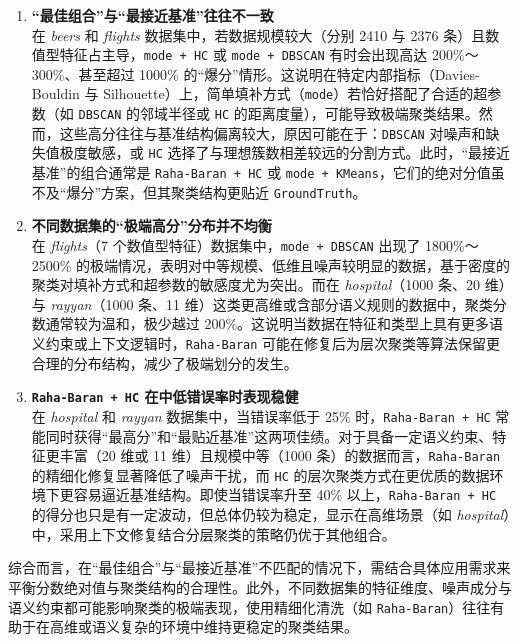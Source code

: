\documentclass[10pt]{article} %
\numberwithin{equation}{section}
\begin{document}
\begin{enumerate}
    \item \textbf{“最佳组合”与“最接近基准”往往不一致}  \\
    在 \textit{beers} 和 \textit{flights} 数据集中，若数据规模较大（分别 2410 与 2376 条）且数值型特征占主导，\texttt{mode + HC} 或 \texttt{mode + DBSCAN} 有时会出现高达 200\%～300\%、甚至超过 1000\% 的“爆分”情形。这说明在特定内部指标（Davies-Bouldin 与 Silhouette）上，简单填补方式（\texttt{mode}）若恰好搭配了合适的超参数（如 \texttt{DBSCAN} 的邻域半径或 \texttt{HC} 的距离度量），可能导致极端聚类结果。然而，这些高分往往与基准结构偏离较大，原因可能在于：\texttt{DBSCAN} 对噪声和缺失值极度敏感，或 \texttt{HC} 选择了与理想簇数相差较远的分割方式。此时，“最接近基准”的组合通常是 \texttt{Raha-Baran + HC} 或 \texttt{mode + KMeans}，它们的绝对分值虽不及“爆分”方案，但其聚类结构更贴近 \texttt{GroundTruth}。

    \item \textbf{不同数据集的“极端高分”分布并不均衡}  \\
    在 \textit{flights}（7 个数值型特征）数据集中，\texttt{mode + DBSCAN} 出现了 1800\%～2500\% 的极端情况，表明对中等规模、低维且噪声较明显的数据，基于密度的聚类对填补方式和超参数的敏感度尤为突出。而在 \textit{hospital}（1000 条、20 维）与 \textit{rayyan}（1000 条、11 维）这类更高维或含部分语义规则的数据中，聚类分数通常较为温和，极少越过 200\%。这说明当数据在特征和类型上具有更多语义约束或上下文逻辑时，\texttt{Raha-Baran} 可能在修复后为层次聚类等算法保留更合理的分布结构，减少了极端划分的发生。

    \item \textbf{\texttt{Raha-Baran + HC} 在中低错误率时表现稳健}  \\
    在 \textit{hospital} 和 \textit{rayyan} 数据集中，当错误率低于 25\% 时，\texttt{Raha-Baran + HC} 常能同时获得“最高分”和“最贴近基准”这两项佳绩。对于具备一定语义约束、特征更丰富（20 维或 11 维）且规模中等（1000 条）的数据而言，\texttt{Raha-Baran} 的精细化修复显著降低了噪声干扰，而 \texttt{HC} 的层次聚类方式在更优质的数据环境下更容易逼近基准结构。即使当错误率升至 40\% 以上，\texttt{Raha-Baran + HC} 的得分也只是有一定波动，但总体仍较为稳定，显示在高维场景（如 \textit{hospital}）中，采用上下文修复结合分层聚类的策略仍优于其他组合。
\end{enumerate}

综合而言，在“最佳组合”与“最接近基准”不匹配的情况下，需结合具体应用需求来平衡分数绝对值与聚类结构的合理性。此外，不同数据集的特征维度、噪声成分与语义约束都可能影响聚类的极端表现，使用精细化清洗（如 \texttt{Raha-Baran}）往往有助于在高维或语义复杂的环境中维持更稳定的聚类结果。
\end{document}
